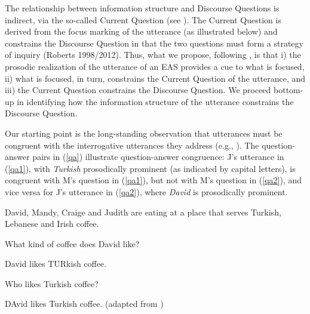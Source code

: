\documentclass[11pt,fleqn]{article}
\newcommand{\6}{\mbox{$[\hspace*{-.6mm}[$}}
\newcommand{\9}{\mbox{$]\hspace*{-.6mm}]$}}
\begin{document}
The relationship between information structure and Discourse Questions is indirect, via  the so-called Current Question (see \citealt{beaver-clark08,best-question,brst-ar}). The Current Question is derived from the focus marking of the utterance (as illustrated below) and constrains the Discourse Question in that the two questions must form a strategy of inquiry (Roberts 1998/2012\nocite{roberts98,roberts12}). Thus, what we propose, following \citealt{best-question}, is that i) the prosodic realization of the utterance of an EAS provides a cue to what is focused, ii) what is focused, in turn, constrains the Current Question of the utterance, and iii) the Current Question constrains the Discourse Question. We proceed bottom-up in identifying how the information structure of the utterance constrains the Discourse Question. 

Our starting point is the long-standing observation that utterances must be congruent with the interrogative utterances
they address (e.g., \citealt{paul1880,paul1919,vstechow90,rooth92}). The
question-answer pairs in (\ref{qa}) illustrate
question-answer congruence: J's utterance in (\ref{qa1}), with {\em
Turkish} prosodically prominent (as indicated by capital letters), is congruent with M's question in
(\ref{qa1}), but not with M's question in (\ref{qa2}), and vice versa
for J's utterance in (\ref{qa2}), where {\em David} is prosodically
prominent.

\begin{exe} 

\ex\label{qa} David, Mandy, Craige and Judith are eating at a place that serves Turkish, Lebanese and Irish coffee.

\begin{xlist} 

\ex\label{qa1} 

\begin{xlist}

 What kind of coffee does David like? 

 David likes TURkish coffee.

\end{xlist}

\ex\label{qa2}

\begin{xlist}

 Who likes Turkish coffee?

 DAvid likes Turkish coffee. \hfill (adapted from \citealt[951]{tonhauser-salt26})

\end{xlist}

\end{xlist}
\end{exe}
\end{document}
